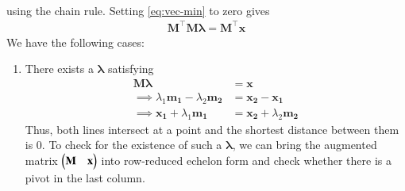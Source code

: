 \documentclass[journal,12pt,twocolumn]{IEEEtran}
\renewcommand{\vec}[1]{\boldsymbol{\mathbf{#1}}}
\begin{document}
\begin{enumerate}
\begin{align}
        \label{eq:vec-min}
    \end{align}
    using the chain rule. Setting \eqref{eq:vec-min} to zero gives
    \begin{align}
        \vec{M}^\top\vec{M\lambda} = \vec{M}^\top\vec{x}
        \label{eq:vec-eqn}
    \end{align}
    We have the following cases:
    \begin{enumerate}
        \item There exists a $\vec{\lambda}$ satisfying
        \begin{align}
            \vec{M}\vec{\lambda} &= \vec{x} \\
            \implies \lambda_1\vec{m_1} - \lambda_2\vec{m_2} &= \vec{x_2}-\vec{x_1} \\
            \implies \vec{x_1} + \lambda_1\vec{m_1} &= \vec{x_2} + \lambda_2\vec{m_2}
            \label{eq:intersect}
        \end{align}
        Thus, both lines intersect at a point and the shortest
        distance between them is 0. To check for the existence of such a 
        $\vec{\lambda}$, we can bring the augmented matrix 
        $\myvec{\vec{M}&\vec{x}}$ into row-reduced echelon form and check 
        whether there is a pivot in the last column.


\end{enumerate}
\end{enumerate}
\end{document}
